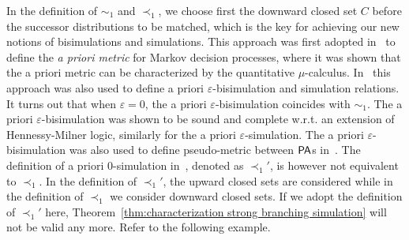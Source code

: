 \documentclass{LMCS}
\def\epsilon{\varepsilon}
\newcommand{\PA}{{\sf PA}}
\newcommand{\iBS}[1]{\sim_{#1}}
\newcommand{\iSi}[1]{\prec_{#1}}
\begin{document}
In the definition of $\iBS{1}$ and $\iSi{1}$, we choose first the
downward closed set $C$ before the successor distributions to be
matched, which is the key for achieving our new notions of
bisimulations and simulations. This approach was first adopted
in~\cite{AlfaroMRS07} to define the \emph{a priori metric} for Markov
decision processes, where it was shown that the a priori metric can be
characterized by the quantitative $\mu$-calculus. In~\cite{qapl} this
approach was also used to define a priori $\epsilon$-bisimulation
and simulation relations. 
\iffalse
It turns out that when $\epsilon=0$, the  a priori
$\epsilon$-bisimulation coincides with $\iBS{1}$. The a priori
$\epsilon$-bisimulation was shown to be sound and complete w.r.t. an
extension of Hennessy-Milner logic, similarly for the a priori
$\epsilon$-simulation.  The a priori $\epsilon$-bisimulation was also
used to define pseudo-metric between $\PA$s in~\cite{qapl}. The
definition of a priori $0$-simulation in~\cite{qapl}, denoted as
$\iSi{1}'$, is however not equivalent to $\iSi{1}$. In the definition
of $\iSi{1}'$, the upward closed sets are considered while in the
definition of $\iSi{1}$ we consider downward closed sets. If we adopt
the definition of $\iSi{1}'$ here, Theorem~\ref{thm:characterization
  strong branching simulation} will not be valid any more. Refer to the
following example.
\end{document}
